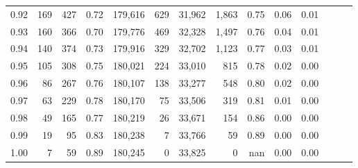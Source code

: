 \begin{tabular}{rrrrrrrrrrrrrr}
0.92 &    169 &  427 &  0.72 &  179,616 &      629 &  31,962 &   1,863 &  0.75 &  0.06 &      0.01 \\
0.93 &    160 &  366 &  0.70 &  179,776 &      469 &  32,328 &   1,497 &  0.76 &  0.04 &      0.01 \\
0.94 &    140 &  374 &  0.73 &  179,916 &      329 &  32,702 &   1,123 &  0.77 &  0.03 &      0.01 \\
0.95 &    105 &  308 &  0.75 &  180,021 &      224 &  33,010 &     815 &  0.78 &  0.02 &      0.00 \\
0.96 &     86 &  267 &  0.76 &  180,107 &      138 &  33,277 &     548 &  0.80 &  0.02 &      0.00 \\
0.97 &     63 &  229 &  0.78 &  180,170 &       75 &  33,506 &     319 &  0.81 &  0.01 &      0.00 \\
0.98 &     49 &  165 &  0.77 &  180,219 &       26 &  33,671 &     154 &  0.86 &  0.00 &      0.00 \\
0.99 &     19 &   95 &  0.83 &  180,238 &        7 &  33,766 &      59 &  0.89 &  0.00 &      0.00 \\
1.00 &      7 &   59 &  0.89 &  180,245 &        0 &  33,825 &       0 &   nan &  0.00 &      0.00 \\
\bottomrule
\end{tabular}

